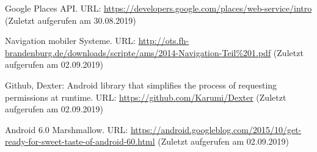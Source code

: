 \documentclass[12pt,oneside]{scrreprt}
\begin{document}
\begin{thebibliography}{10}
 Google Places API. URL: \url{https://developers.google.com/places/web-service/intro} (Zuletzt aufgerufen am 30.08.2019)

 Navigation mobiler Systeme. URL: \url{http://ots.fh-brandenburg.de/downloads/scripte/ams/2014-Navigation-Teil\%201.pdf} (Zuletzt aufgerufen am 02.09.2019)

 Github, Dexter: Android library that simplifies the process of requesting permissions at runtime. URL: \url{https://github.com/Karumi/Dexter} (Zuletzt aufgerufen am 02.09.2019)

 Android 6.0 Marshmallow. URL: \url{https://android.googleblog.com/2015/10/get-ready-for-sweet-taste-of-android-60.html}  (Zuletzt aufgerufen am 02.09.2019)












	\end{thebibliography}  
  \newpage
  
  \listoffigures
  \newpage
 
  
\end{document}
